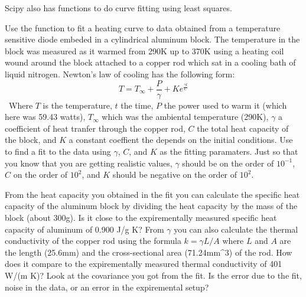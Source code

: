 Scipy also has functions to do curve fitting using least squares.

\begin{problem}
Use the  function to fit a heating curve to data obtained from a temperature sensitive diode embeded in a cylindrical aluminum block. The temperature in the block was measured as it warmed from 290K up to 370K using a heating coil wound around the block attached to a copper rod which sat in a cooling bath of liquid nitrogen. 
Newton's law of cooling has the following form:
\[
T = T_{\infty} + \frac{P}{\gamma}+Ke^{\frac{\gamma t}{C}}
\]\
Where $T$ is the temperature, $t$ the time, $P$ the power used to warm it (which here was 59.43 watts), $T_{\infty}$ which was the ambiental temperature (290K), $\gamma$ a coefficient of heat tranfer through the copper rod, $C$ the total heat capacity of the block, and $K$ a constant coeffient the depends on the initial conditions. Use  to find a fit to the data using $\gamma$, $C$, and $K$ as the fitting paramaters. Just so that you know that you are getting realistic values, $\gamma$ should be on the order of $10^{-1}$, $C$ on the order of $10^{2}$, and $K$ should be negative on the order of $10^{2}$.

From the heat capacity you obtained in the fit you can calculate the specific heat capacity of the aluminum block by dividing the heat capacity by the mass of the block (about 300g). Is it close to the expirementally measured specific heat capacity of aluminum of 0.900 J/g K? From $\gamma$ you can also calculate the thermal conductivity of the copper rod using the formula $k=\gamma L/A$ where $L$ and $A$ are the length (25.6mm) and the cross-sectional area (71.24mm^{3}) of the rod. How does it compare to the expirementally measured thermal conductivity of 401 W/(m \dot K)? Look at the covariance you got from the fit. Is the error due to the fit, noise in the data, or an error in the expiremental setup?
\end{problem}





